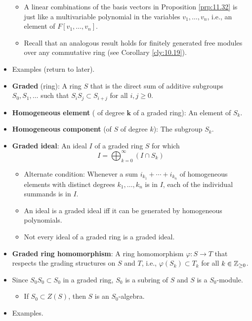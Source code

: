 \documentclass[../notes.tex]{subfiles}
\begin{document}
\begin{itemize}
    \begin{itemize}
        \item A linear combinations of the basis vectors in Proposition \ref{prp:11.32} is just like a multivariable polynomial in the variables $v_1,\dots,v_n$, i.e., an element of $F[v_1,\dots,v_n]$.
        \item {}Recall that an analogous result holds for finitely generated free modules over any commutative ring (see Corollary \ref{cly:10.19}).
    \end{itemize}
    \item Examples (return to later).
    \item \textbf{Graded} (ring): A ring $S$ that is the direct sum of additive subgroups $S_0,S_1,\dots$ such that $S_iS_j\subset S_{i+j}$ for all $i,j\geq 0$.
    \item \textbf{Homogeneous element} ( of degree $\bm{k}$ of a graded ring): An element of $S_k$.
    \item \textbf{Homogeneous component} (of $S$ of degree $k$): The subgroup $S_k$.
    \item \textbf{Graded ideal}: An ideal $I$ of a graded ring $S$ for which
    \begin{equation*}
        I = \bigoplus_{k=0}^\infty(I\cap S_k)
    \end{equation*}
    \begin{itemize}
        \item Alternate condition: Whenever a sum $i_{k_1}+\cdots+i_{k_n}$ of homogeneous elements with distinct degrees $k_1,\dots,k_n$ is in $I$, each of the individual summands is in $I$.
        \item An ideal is a graded ideal iff it can be generated by homogeneous polynomials.
        \item Not every ideal of a graded ring is a graded ideal.
    \end{itemize}
    \item \textbf{Graded ring homomorphism}: A ring homomorphism $\varphi:S\to T$ that respects the grading structures on $S$ and $T$, i.e., $\varphi(S_k)\subset T_k$ for all $k\in{\mathbb{Z}_{\geq 0}}$.
    \item Since $S_0S_0\subset S_0$ in a graded ring, $S_0$ is a subring of $S$ and $S$ is a $S_0$-module.
    \begin{itemize}
        \item If $S_0\subset Z(S)$, then $S$ is an $S_0$-algebra.
    \end{itemize}
    \item Examples.

\end{itemize}
\end{document}
